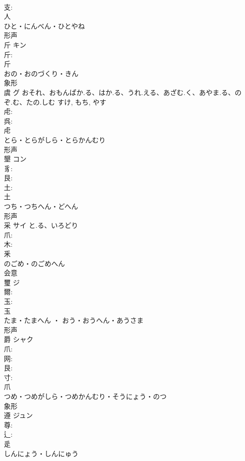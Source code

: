 \documentclass[8pt]{extreport}
\begin{document}
\begin{CJK}{UTF8}{min}
\\	支: 
\\	人	
\\	ひと・にんべん・ひとやね	
\\	形声 
\\	斤	キン			
\\	斤: 
\\	斤	
\\	おの・おのづくり・きん	
\\	象形 
\\	虞	グ	おそれ、おもんぱか.る、はか.る、うれ.える、あざむ.く、あやま.る、のぞ.む、たの.しむ	すけ, もち, やす	
\\	虍: 
\\	呉: 
\\	虍	
\\	とら・とらがしら・とらかんむり	
\\	形声 
\\	墾	コン			
\\	豸: 
\\	艮: 
\\	土: 
\\	土	
\\	つち・つちへん・どへん	
\\	形声 
\\	采	サイ	と.る、いろどり		
\\	爪: 
\\	木: 
\\	釆	
\\	のごめ・のごめへん	
\\	会意 
\\	璽	ジ			
\\	爾: 
\\	玉: 
\\	玉	
\\	たま・たまへん ・ おう・おうへん・あうさま	
\\	形声 
\\	爵	シャク			
\\	爪: 
\\	网: 
\\	艮: 
\\	寸: 
\\	爪	
\\	つめ・つめがしら・つめかんむり・そうにょう・のつ	
\\	象形 
\\	遵	ジュン			
\\	尊: 
\\	辶: 
\\	辵	
\\	しんにょう・しんにゅう	

\end{CJK}
\end{document}
